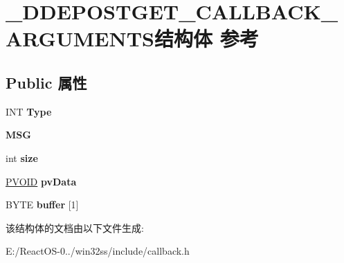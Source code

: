 \hypertarget{struct___d_d_e_p_o_s_t_g_e_t___c_a_l_l_b_a_c_k___a_r_g_u_m_e_n_t_s}{}\section{\+\_\+\+D\+D\+E\+P\+O\+S\+T\+G\+E\+T\+\_\+\+C\+A\+L\+L\+B\+A\+C\+K\+\_\+\+A\+R\+G\+U\+M\+E\+N\+T\+S结构体 参考}
\label{struct___d_d_e_p_o_s_t_g_e_t___c_a_l_l_b_a_c_k___a_r_g_u_m_e_n_t_s}
\subsection*{Public 属性}
\begin{DoxyCompactItemize}
\item 
\mbox{\label{struct___d_d_e_p_o_s_t_g_e_t___c_a_l_l_b_a_c_k___a_r_g_u_m_e_n_t_s_a4de8aacee2095eeb46862f7afac04d91}} 
I\+NT {\bfseries Type}
\item 
\mbox{\label{struct___d_d_e_p_o_s_t_g_e_t___c_a_l_l_b_a_c_k___a_r_g_u_m_e_n_t_s_acef79edb343cfef35bd04f84125e3dfc}} 
{\bfseries M\+SG}
\item 
\mbox{\label{struct___d_d_e_p_o_s_t_g_e_t___c_a_l_l_b_a_c_k___a_r_g_u_m_e_n_t_s_a4f9b929cae32a6a44349bf80704855ca}} 
int {\bfseries size}
\item 
\mbox{\label{struct___d_d_e_p_o_s_t_g_e_t___c_a_l_l_b_a_c_k___a_r_g_u_m_e_n_t_s_a8cf9e34979bd46264e75b3335976afd8}} 
\hyperlink{interfacevoid}{P\+V\+O\+ID} {\bfseries pv\+Data}
\item 
\mbox{\label{struct___d_d_e_p_o_s_t_g_e_t___c_a_l_l_b_a_c_k___a_r_g_u_m_e_n_t_s_a8fac1db259d6f4924bff693138539886}} 
B\+Y\+TE {\bfseries buffer} \mbox{[}1\mbox{]}
\end{DoxyCompactItemize}


该结构体的文档由以下文件生成\+:\begin{DoxyCompactItemize}
\item 
E\+:/\+React\+O\+S-\/0../win32ss/include/callback.\+h\end{DoxyCompactItemize}
